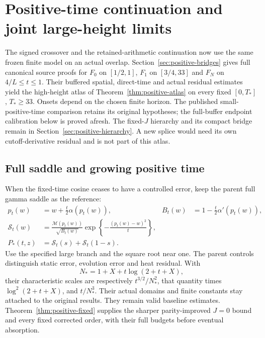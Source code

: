 \documentclass[11pt]{article}
\newcommand{\Mc}{\mathcal M}
\newcommand{\Sc}{\mathcal S}
\numberwithin{equation}{section}
\begin{document}
\section{Positive-time continuation and joint large-height limits}
\label{sec:positive-coverage}
The signed crossover and the retained-arithmetic continuation now use
the same frozen finite model on an actual overlap. Section~\ref{sec:positive-bridges}
gives full canonical source proofs for $F_0$ on $[1/2,1]$, $F_1$ on
$[3/4,33]$ and $F_N$ on $4/L\le t\le1$. Their buffered spatial,
direct-time and actual residual estimates yield the high-height atlas
of Theorem~\ref{thm:positive-atlas} on every fixed $[0,T_*]$,
$T_*\ge33$. Onsets depend on the chosen finite horizon. The published
small-positive-time comparison retains its original hypotheses;
the full-buffer endpoint calibration below is proved afresh.
The fixed-$J$ hierarchy and its compact bridge remain in
Section~\ref{sec:positive-hierarchy}. A new splice would need its own
cutoff-derivative residual and is not part of this atlas.

\subsection{Full saddle and growing positive time}
\label{sec:joint}
When the fixed-time cosine ceases to have a controlled error, keep the
parent full gamma saddle as the reference:
\begin{align}
p_t(w)&=w+\frac t2\alpha(p_t(w)),&
B_t(w)&=1-\frac t2\alpha'(p_t(w)),\\
\Sc_t(w)&=\frac{\Mc(p_t(w))}
 {\sqrt{B_t(w)}}\exp\left\{-\frac{(p_t(w)-w)^2}{t}\right\},\\
P_*(t,z)&=\Sc_t(s)+\Sc_t(1-s). \label{eq:full-saddle}
\end{align}
Use the specified large branch and the square root near one.
The parent controls distinguish static error, evolution error and heat
residual. With
\[
N_*=1+X+t\log(2+t+X),
\]
their characteristic scales are respectively
\(t^{3/2}/N_*^2\), that quantity times \(\log^2(2+t+X)\), and
\(t/N_*^3\). Their actual domains and finite constants stay attached
to the original results. They remain valid baseline estimates.
Theorem~\ref{thm:positive-fixed} supplies the sharper parity-improved
$J=0$ bound and every fixed corrected order, with their full budgets
before eventual absorption.
\end{document}
